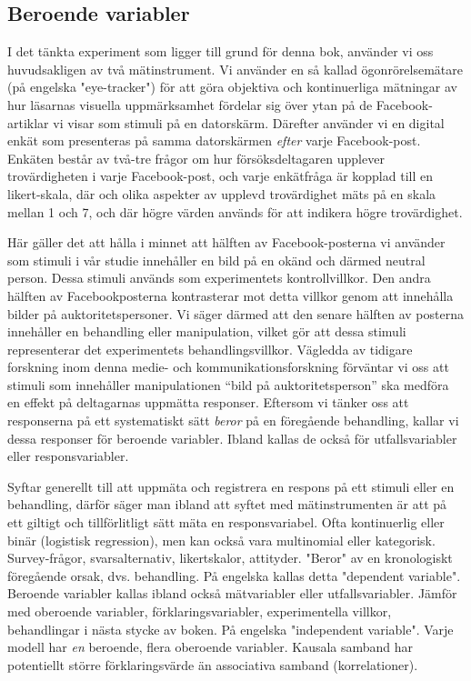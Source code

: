 \documentclass[
]{book}
\begin{document}
\hypertarget{sub07.3.4}{%
\subsection{Beroende variabler}\label{sub07.3.4}}

I det tänkta experiment som ligger till grund för denna bok, använder vi oss huvudsakligen av två mätinstrument. Vi använder en så kallad ögonrörelsemätare (på engelska "eye-tracker") för att göra objektiva och kontinuerliga mätningar av hur läsarnas visuella uppmärksamhet fördelar sig över ytan på de Facebook-artiklar vi visar som stimuli på en datorskärm. Därefter använder vi en digital enkät som presenteras på samma datorskärmen \emph{efter} varje Facebook-post. Enkäten består av två-tre frågor om hur försöksdeltagaren upplever trovärdigheten i varje Facebook-post, och varje enkätfråga är kopplad till en likert-skala, där och olika aspekter av upplevd trovärdighet mäts på en skala mellan 1 och 7, och där högre värden används för att indikera högre trovärdighet.

Här gäller det att hålla i minnet att hälften av Facebook-posterna vi använder som stimuli i vår studie innehåller en bild på en okänd och därmed neutral person. Dessa stimuli används som experimentets kontrollvillkor. Den andra hälften av Facebookposterna kontrasterar mot detta villkor genom att innehålla bilder på auktoritetspersoner. Vi säger därmed att den senare hälften av posterna innehåller en behandling eller manipulation, vilket gör att dessa stimuli representerar det experimentets behandlingsvillkor. Vägledda av tidigare forskning inom denna medie- och kommunikationsforskning förväntar vi oss att stimuli som innehåller manipulationen ``bild på auktoritetsperson'' ska medföra en effekt på deltagarnas uppmätta responser. Eftersom vi tänker oss att responserna på ett systematiskt sätt \emph{beror} på en föregående behandling, kallar vi dessa responser för beroende variabler. Ibland kallas de också för utfallsvariabler eller responsvariabler.

Syftar generellt till att uppmäta och registrera en respons på ett stimuli eller en behandling, därför säger man ibland att syftet med mätinstrumenten är att på ett giltigt och tillförlitligt sätt mäta en responsvariabel. Ofta kontinuerlig eller binär (logistisk regression), men kan också vara multinomial eller kategorisk. Survey-frågor, svarsalternativ, likertskalor, attityder. "Beror" av en kronologiskt föregående orsak, dvs. behandling. På engelska kallas detta "dependent variable". Beroende variabler kallas ibland också mätvariabler eller utfallsvariabler. Jämför med oberoende variabler, förklaringsvariabler, experimentella villkor, behandlingar i nästa stycke av boken. På engelska "independent variable". Varje modell har \emph{en} beroende, flera oberoende variabler. Kausala samband har potentiellt större förklaringsvärde än associativa samband (korrelationer).
\end{document}
